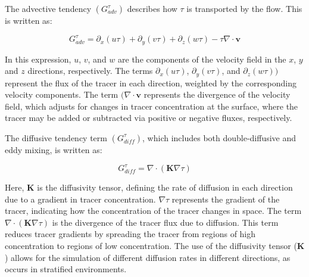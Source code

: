 \documentclass[draft]{agujournal2019}
\begin{document}
The advective tendency $(G^{\tau}_{adv})$ describes how $\tau$ is transported by the flow. This is written as:

\begin{equation}
G^{\tau}_{{adv}} = \partial_x (u\tau) + \partial_y (v\tau) + \partial_z (w\tau) - \tau \nabla \cdot \mathbf{v} \label{eq:adv}
\end{equation}

In this expression, $u$, $v$, and $w$ are the components of the velocity field in the $x$, $y$ and $z$ directions, respectively. The terms $\partial_x(u\tau)$, $\partial_y (v\tau)$, and $\partial_z (w\tau))$ represent the flux of the tracer in each direction, weighted by the corresponding velocity components. The term $(\nabla \cdot \mathbf{v}$ represents the divergence of the velocity field, which adjusts for changes in tracer concentration at the surface, where the tracer may be added or subtracted via positive or negative fluxes, respectively.

The diffusive tendency term $(G^{\tau}_{{diff}})$, which includes both double-diffusive and eddy mixing, is written as:


\begin{equation}
G^{\tau}_{{diff}} = \nabla \cdot (\mathbf{K} \nabla \tau) \label{eq:diff}
\end{equation}

Here, $\mathbf{K}$ is the diffusivity tensor, defining the rate of diffusion in each direction due to a gradient in tracer concentration. $\nabla \tau$ represents the gradient of the tracer, indicating how the concentration of the tracer changes in space. The term $\nabla \cdot (\mathbf{K} \nabla \tau)$ is the divergence of the tracer flux due to diffusion. This term reduces tracer gradients by spreading the tracer from regions of high concentration to regions of low concentration. The use of the diffusivity tensor (\(\mathbf{K}\)) allows for the simulation of different diffusion rates in different directions, as occurs in stratified environments.


\end{document}
